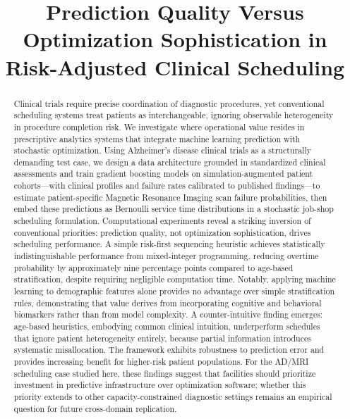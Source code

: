 \documentclass[11pt,a4paper]{article}
\title{Prediction Quality Versus Optimization Sophistication in Risk-Adjusted Clinical Scheduling}
\date{}
\begin{document}
\sloppy
\maketitle


\begin{abstract}
Clinical trials require precise coordination of diagnostic procedures, yet conventional scheduling systems treat patients as interchangeable, ignoring observable heterogeneity in procedure completion risk. We investigate where operational value resides in prescriptive analytics systems that integrate machine learning prediction with stochastic optimization. Using Alzheimer's disease clinical trials as a structurally demanding test case, we design a data architecture grounded in standardized clinical assessments and train gradient boosting models on simulation-augmented patient cohorts---with clinical profiles and failure rates calibrated to published findings---to estimate patient-specific Magnetic Resonance Imaging scan failure probabilities, then embed these predictions as Bernoulli service time distributions in a stochastic job-shop scheduling formulation. Computational experiments reveal a striking inversion of conventional priorities: prediction quality, not optimization sophistication, drives scheduling performance. A simple risk-first sequencing heuristic achieves statistically indistinguishable performance from mixed-integer programming, reducing overtime probability by approximately nine percentage points compared to age-based stratification, despite requiring negligible computation time. Notably, applying machine learning to demographic features alone provides no advantage over simple stratification rules, demonstrating that value derives from incorporating cognitive and behavioral biomarkers rather than from model complexity. A counter-intuitive finding emerges: age-based heuristics, embodying common clinical intuition, underperform schedules that ignore patient heterogeneity entirely, because partial information introduces systematic misallocation. The framework exhibits robustness to prediction error and provides increasing benefit for higher-risk patient populations. For the AD/MRI scheduling case studied here, these findings suggest that facilities should prioritize investment in predictive infrastructure over optimization software; whether this priority extends to other capacity-constrained diagnostic settings remains an empirical question for future cross-domain replication.
\end{abstract}
\end{document}
